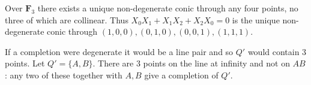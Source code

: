 Over $\mathbf{F}_3$ there exists a unique non-degenerate conic through any four points, no three of which are collinear. Thus $X_0X_1 + X_1X_2 + X_2X_0 = 0$ is the unique non-degenerate conic through $(1, 0, 0), (0, 1, 0), (0, 0, 1), (1, 1, 1)$.

If a completion were degenerate it would be a line pair and so $Q'$ would contain 3 points. Let $Q' = \{A, B\}$. There are 3 points on the line at infinity and not on $AB$: any two of these together with $A, B$ give a completion of $Q'$.
